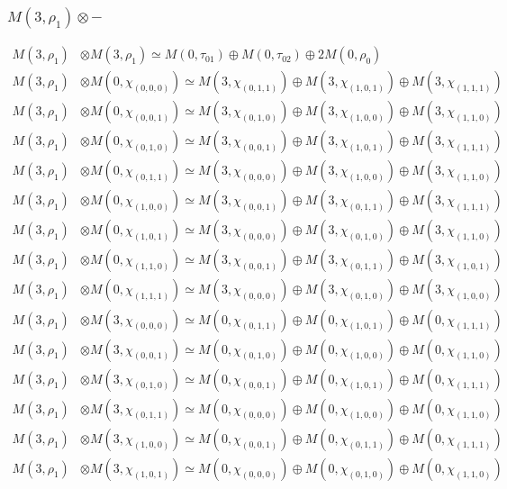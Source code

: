 \subsubsection{$ M(3,\rho_{1})\otimes -$}
\begin{align*}
M(3,\rho_{1}) &\otimes M(3,\rho_{1}) \simeq M(0,\tau_{01}) \oplus M(0,\tau_{02}) \oplus 2 M(0,\rho_{0}) \\
M(3,\rho_{1}) &\otimes M(0,\chi_{(0,0,0)}) \simeq M(3,\chi_{(0,1,1)}) \oplus M(3,\chi_{(1,0,1)}) \oplus M(3,\chi_{(1,1,1)}) \\
M(3,\rho_{1}) &\otimes M(0,\chi_{(0,0,1)}) \simeq M(3,\chi_{(0,1,0)}) \oplus M(3,\chi_{(1,0,0)}) \oplus M(3,\chi_{(1,1,0)}) \\
M(3,\rho_{1}) &\otimes M(0,\chi_{(0,1,0)}) \simeq M(3,\chi_{(0,0,1)}) \oplus M(3,\chi_{(1,0,1)}) \oplus M(3,\chi_{(1,1,1)}) \\
M(3,\rho_{1}) &\otimes M(0,\chi_{(0,1,1)}) \simeq M(3,\chi_{(0,0,0)}) \oplus M(3,\chi_{(1,0,0)}) \oplus M(3,\chi_{(1,1,0)}) \\
M(3,\rho_{1}) &\otimes M(0,\chi_{(1,0,0)}) \simeq M(3,\chi_{(0,0,1)}) \oplus M(3,\chi_{(0,1,1)}) \oplus M(3,\chi_{(1,1,1)}) \\
M(3,\rho_{1}) &\otimes M(0,\chi_{(1,0,1)}) \simeq M(3,\chi_{(0,0,0)}) \oplus M(3,\chi_{(0,1,0)}) \oplus M(3,\chi_{(1,1,0)}) \\
M(3,\rho_{1}) &\otimes M(0,\chi_{(1,1,0)}) \simeq M(3,\chi_{(0,0,1)}) \oplus M(3,\chi_{(0,1,1)}) \oplus M(3,\chi_{(1,0,1)}) \\
M(3,\rho_{1}) &\otimes M(0,\chi_{(1,1,1)}) \simeq M(3,\chi_{(0,0,0)}) \oplus M(3,\chi_{(0,1,0)}) \oplus M(3,\chi_{(1,0,0)}) \\
M(3,\rho_{1}) &\otimes M(3,\chi_{(0,0,0)}) \simeq M(0,\chi_{(0,1,1)}) \oplus M(0,\chi_{(1,0,1)}) \oplus M(0,\chi_{(1,1,1)}) \\
M(3,\rho_{1}) &\otimes M(3,\chi_{(0,0,1)}) \simeq M(0,\chi_{(0,1,0)}) \oplus M(0,\chi_{(1,0,0)}) \oplus M(0,\chi_{(1,1,0)}) \\
M(3,\rho_{1}) &\otimes M(3,\chi_{(0,1,0)}) \simeq M(0,\chi_{(0,0,1)}) \oplus M(0,\chi_{(1,0,1)}) \oplus M(0,\chi_{(1,1,1)}) \\
M(3,\rho_{1}) &\otimes M(3,\chi_{(0,1,1)}) \simeq M(0,\chi_{(0,0,0)}) \oplus M(0,\chi_{(1,0,0)}) \oplus M(0,\chi_{(1,1,0)}) \\
M(3,\rho_{1}) &\otimes M(3,\chi_{(1,0,0)}) \simeq M(0,\chi_{(0,0,1)}) \oplus M(0,\chi_{(0,1,1)}) \oplus M(0,\chi_{(1,1,1)}) \\
M(3,\rho_{1}) &\otimes M(3,\chi_{(1,0,1)}) \simeq M(0,\chi_{(0,0,0)}) \oplus M(0,\chi_{(0,1,0)}) \oplus M(0,\chi_{(1,1,0)}) \\

\end{align*}
